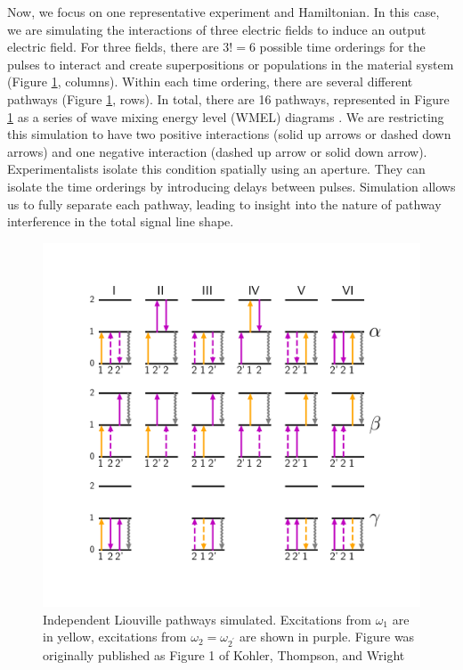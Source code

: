 Now, we focus on one representative experiment and Hamiltonian. In this
case, we are simulating the interactions of three electric fields to
induce an output electric field. For three fields, there are \(3! = 6\)
possible time orderings for the pulses to interact and create
superpositions or populations in the material system (Figure
\ref{sim:fig:WMELs}, columns). Within each time ordering, there are
several different pathways (Figure \ref{sim:fig:WMELs}, rows). In total,
there are 16 pathways, represented in Figure \ref{sim:fig:WMELs} as a
series of wave mixing energy level (WMEL) diagrams \cite{Lee_1985}.
We are restricting this simulation to have two positive interactions
(solid up arrows or dashed down arrows) and one negative interaction
(dashed up arrow or solid down arrow). Experimentalists isolate this
condition spatially using an aperture. They can isolate the time
orderings by introducing delays between pulses. Simulation allows us to
fully separate each pathway, leading to insight into the nature of
pathway interference in the total signal line shape.

\begin{figure}
\centering
	\includegraphics[width=\textwidth]{simulation/images/WMELs.png}
\caption{Independent Liouville pathways simulated. Excitations from
\(\omega_1\) are in yellow, excitations from
\(\omega_2 = \omega_{2^\prime}\) are shown in purple. Figure was
originally published as Figure 1 of Kohler, Thompson, and Wright
\cite{KohlerDanielDavid2017a} \label{sim:fig:WMELs}}
\end{figure}

